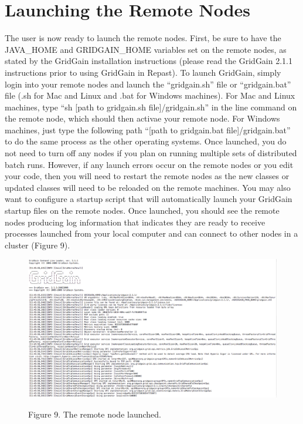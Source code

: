\documentclass[12pt]{article}
\begin{document}
\section{Launching the Remote Nodes}

The user is now ready to launch the remote nodes. First, be sure to
have the JAVA\_HOME and GRIDGAIN\_HOME variables set on the remote
nodes, as stated by the GridGain installation instructions (please
read the GridGain 2.1.1 instructions prior to using GridGain in
Repast). To launch GridGain, simply login into your remote nodes and
launch the ``gridgain.sh'' file or ``gridgain.bat'' file (.sh for Mac and
Linux and .bat for Windows machines). For Mac and Linux machines, type
``sh [path to gridgain.sh file]/gridgain.sh'' in the line command on
the remote node, which should then activae your remote node. For
Windows machines, just type the following path ``[path to gridgain.bat
file]/gridgain.bat'' to do the same process as the other operating
systems. Once launched, you do not need to turn off any nodes if you plan
on running multiple sets of distributed batch runs. However, if any
launch errors occur on the remote nodes or you edit your code, then you will
need to restart the remote nodes as the new classes or updated classes
will need to be reloaded on the remote machines. You may also want to
configure a startup script that will automatically launch your
GridGain startup files on the remote nodes. Once launched, you should
see the remote nodes producing log information that indicates they are
ready to receive processes launched from your local computer and can
connect to other nodes in a cluster (Figure 9).

\begin{figure}[!t]
\begin{center}
\includegraphics [width=\textwidth]{images/Figure9.jpg}
\label{cablehealth}
\begin{minipage}{.9\textwidth}Figure 9. The remote node launched.
\end{minipage}
\end{center}
\end{figure}
\end{document}
